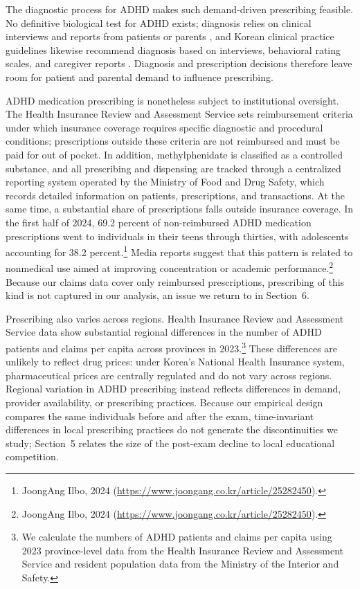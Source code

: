 \documentclass[12pt]{article}
\begin{document}
The diagnostic process for ADHD makes such demand-driven prescribing feasible. No definitive biological test for ADHD exists; diagnosis relies on clinical interviews and reports from patients or parents \citep{faraone2015}, and Korean clinical practice guidelines likewise recommend diagnosis based on interviews, behavioral rating scales, and caregiver reports \citep{lee2017}. Diagnosis and prescription decisions therefore leave room for patient and parental demand to influence prescribing.

ADHD medication prescribing is nonetheless subject to institutional oversight. The Health Insurance Review and Assessment Service sets reimbursement criteria under which insurance coverage requires specific diagnostic and procedural conditions; prescriptions outside these criteria are not reimbursed and must be paid for out of pocket. In addition, methylphenidate is classified as a controlled substance, and all prescribing and dispensing are tracked through a centralized reporting system operated by the Ministry of Food and Drug Safety, which records detailed information on patients, prescriptions, and transactions.
At the same time, a substantial share of prescriptions falls outside insurance coverage. In the first half of 2024, 69.2 percent of non-reimbursed ADHD medication prescriptions went to individuals in their teens through thirties, with adolescents accounting for 38.2 percent.\footnote{JoongAng Ilbo, 2024 (\url{https://www.joongang.co.kr/article/25282450}).} Media reports suggest that this pattern is related to nonmedical use aimed at improving concentration or academic performance.\footnote{JoongAng Ilbo, 2024 (\url{https://www.joongang.co.kr/article/25282450}).} Because our claims data cover only reimbursed prescriptions, prescribing of this kind is not captured in our analysis, an issue we return to in Section~6.

Prescribing also varies across regions. Health Insurance Review and Assessment Service data show substantial regional differences in the number of ADHD patients and claims per capita across provinces in 2023.\footnote{We calculate the numbers of ADHD patients and claims per capita using 2023 province-level data from the Health Insurance Review and Assessment Service and resident population data from the Ministry of the Interior and Safety.} These differences are unlikely to reflect drug prices: under Korea's National Health Insurance system, pharmaceutical prices are centrally regulated and do not vary across regions. Regional variation in ADHD prescribing instead reflects differences in demand, provider availability, or prescribing practices. Because our empirical design compares the same individuals before and after the exam, time-invariant differences in local prescribing practices do not generate the discontinuities we study; Section~5 relates the size of the post-exam decline to local educational competition.
\end{document}
